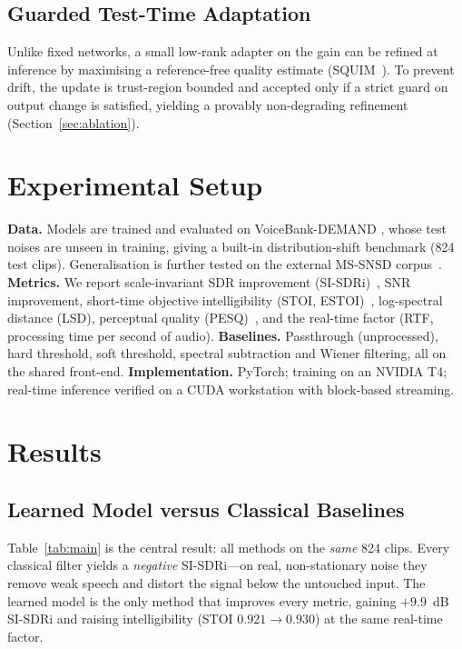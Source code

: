 \documentclass[runningheads]{llncs}
\begin{document}
\subsection{Guarded Test-Time Adaptation}
Unlike fixed networks, a small low-rank adapter on the gain can be refined at
inference by maximising a reference-free quality estimate
(SQUIM~\cite{squim}). To prevent drift, the update is trust-region bounded and
accepted only if a strict guard on output change is satisfied, yielding a
provably non-degrading refinement (Section~\ref{sec:ablation}).

\section{Experimental Setup}
\textbf{Data.} Models are trained and evaluated on VoiceBank-DEMAND
\cite{voicebank}, whose test noises are unseen in training, giving a built-in
distribution-shift benchmark (824 test clips). Generalisation is further tested
on the external MS-SNSD corpus~\cite{msnsd}.
\textbf{Metrics.} We report scale-invariant SDR improvement
(SI-SDRi)~\cite{sisdr}, SNR improvement, short-time objective intelligibility
(STOI, ESTOI)~\cite{stoi}, log-spectral distance (LSD), perceptual quality
(PESQ)~\cite{pesq}, and the real-time factor (RTF, processing time per second of
audio).
\textbf{Baselines.} Passthrough (unprocessed), hard threshold, soft threshold,
spectral subtraction and Wiener filtering, all on the shared front-end.
\textbf{Implementation.} PyTorch; training on an NVIDIA T4; real-time inference
verified on a CUDA workstation with block-based streaming.

\section{Results}\label{sec:results}

\subsection{Learned Model versus Classical Baselines}
Table~\ref{tab:main} is the central result: all methods on the \emph{same}
824 clips. Every classical filter yields a \emph{negative} SI-SDRi---on real,
non-stationary noise they remove weak speech and distort the signal below the
untouched input. The learned model is the only method that improves every
metric, gaining $+9.9$~dB SI-SDRi and raising intelligibility (STOI
$0.921\!\rightarrow\!0.930$) at the same real-time factor.
\end{document}
